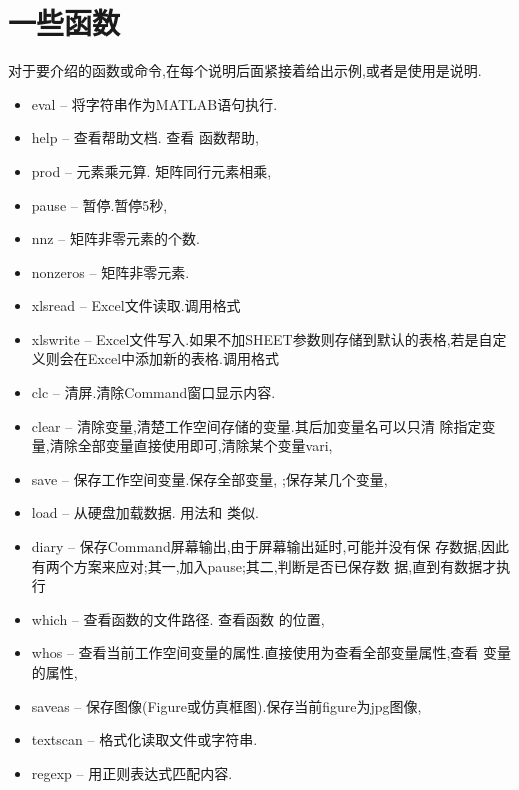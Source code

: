 \section{一些函数}
对于要介绍的函数或命令,在每个说明后面紧接着给出示例,或者是使用是说明.

\begin{itemize}
\item{eval} -- 将字符串作为MATLAB语句执行. 
\item{help} -- 查看帮助文档. 查看  函数帮助, 
\item{prod} -- 元素乘元算. 矩阵同行元素相乘, 
\item{pause} -- 暂停.暂停5秒, 
\item{nnz} -- 矩阵非零元素的个数. 
\item{nonzeros} -- 矩阵非零元素. 
\item{xlsread} -- Excel文件读取.调用格式 
\item{xlswrite} -- Excel文件写入.如果不加SHEET参数则存储到默认的表格,若是自定义则会在Excel中添加新的表格.调用格式 
\item{clc} -- 清屏.清除Command窗口显示内容. 
\item{clear} -- 清除变量,清楚工作空间存储的变量.其后加变量名可以只清
除指定变量,清除全部变量直接使用即可,清除某个变量vari, 
\item{save} -- 保存工作空间变量.保存全部变量, ;保存某几个变量,\\
\item{load} -- 从硬盘加载数据. 用法和  类似.
\item{diary} -- 保存Command屏幕输出,由于屏幕输出延时,可能并没有保
存数据,因此有两个方案来应对;其一,加入pause;其二,判断是否已保存数
据,直到有数据才执行 
\item{which} -- 查看函数的文件路径. 查看函数  的位置, 
\item{whos} -- 查看当前工作空间变量的属性.直接使用为查看全部变量属性,查看  变量的属性, 
\item{saveas} -- 保存图像(Figure或仿真框图).保存当前figure为jpg图像, \\
\item{textscan} -- 格式化读取文件或字符串.
\item{regexp} -- 用正则表达式匹配内容.
\end{itemize}